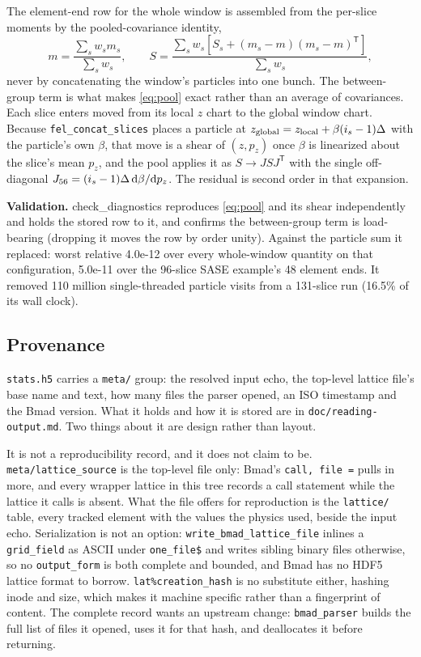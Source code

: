 \documentclass[11pt]{article}
\newcommand{\code}[1]{\texttt{#1}}
\newenvironment{validation}{\par\small\textbf{Validation.}}{\par}
\begin{document}
The element-end row for the whole window is assembled from the per-slice
moments by the pooled-covariance identity,
\begin{equation}
  m = \frac{\sum_s w_s m_s}{\sum_s w_s}, \qquad
  S = \frac{\sum_s w_s \left[ S_s + (m_s - m)(m_s - m)^{\mathsf T} \right]}{\sum_s w_s},
  \label{eq:pool}
\end{equation}
never by concatenating the window's particles into one bunch. The between-group term
is what makes \eqref{eq:pool} exact rather than an average of covariances. Each slice
enters moved from its local $z$ chart to the global window chart. Because
\texttt{fel\_concat\_slices} places a particle at $z_{\rm global} = z_{\rm local} +
\beta (i_s - 1)\Delta$ with the particle's own $\beta$, that move is a shear of
$(z, p_z)$ once $\beta$ is linearized about the slice's mean $p_z$, and the pool
applies it as $S \to J S J^{\mathsf T}$ with the single off-diagonal
$J_{56} = (i_s - 1)\Delta \, {\rm d}\beta/{\rm d}p_z$. The residual is second order
in that expansion.

\begin{validation}
check\_diagnostics reproduces \eqref{eq:pool} and its shear independently and holds
the stored row to it, and confirms the between-group term is load-bearing (dropping it
moves the row by order unity). Against the particle sum it replaced: worst relative
4.0e-12 over every whole-window quantity on that configuration, 5.0e-11 over the
96-slice SASE example's 48 element ends. It removed 110 million single-threaded
particle visits from a 131-slice run (16.5\% of its wall clock).
\end{validation}

\subsection{Provenance}\label{sec:meta}

\texttt{stats.h5} carries a \texttt{meta/} group: the resolved input echo, the
top-level lattice file's base name and text, how many files the parser opened, an ISO
timestamp and the Bmad version. What it holds and how it is stored are in
\code{doc/reading-output.md}. Two things about it are design rather than layout.

It is not a reproducibility record, and it does not claim to be.
\texttt{meta/lattice\_source} is the top-level file only: Bmad's \texttt{call, file =}
pulls in more, and every wrapper lattice in this tree records a call statement while the
lattice it calls is absent. What the file offers for reproduction is the
\texttt{lattice/} table, every tracked element with the values the physics used, beside
the input echo. Serialization is not an option:
\texttt{write\_bmad\_lattice\_file} inlines a \texttt{grid\_field} as ASCII under
\texttt{one\_file\$} and writes sibling binary files otherwise, so no \texttt{output\_form}
is both complete and bounded, and Bmad has no HDF5 lattice format to borrow.
\texttt{lat\%creation\_hash} is no substitute either, hashing inode and size, which makes
it machine specific rather than a fingerprint of content. The complete record wants an
upstream change: \texttt{bmad\_parser} builds the full list of files it opened, uses it
for that hash, and deallocates it before returning.
\end{document}
